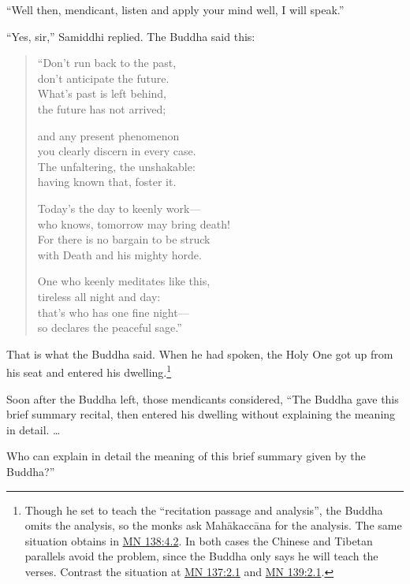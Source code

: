 \documentclass[12pt,openany]{book}%
\begin{document}
“Well then, mendicant, listen and apply your mind well, I will speak.” 

“Yes, sir,” Samiddhi replied. The Buddha said this: 

\begin{verse}%
“Don’t run back to the past, \\
don’t anticipate the future. \\
What’s past is left behind, \\
the future has not arrived; 

and any present phenomenon \\
you clearly discern in every case. \\
The unfaltering, the unshakable: \\
having known that, foster it. 

Today’s the day to keenly work—\\
who knows, tomorrow may bring death! \\
For there is no bargain to be struck \\
with Death and his mighty horde. 

One who keenly meditates like this, \\
tireless all night and day: \\
that’s who has one fine night—\\
so declares the peaceful sage.” 

%
\end{verse}

That is what the Buddha said. When he had spoken, the Holy One got up from his seat and entered his dwelling.\footnote{Though he set to teach the “recitation passage and analysis”, the Buddha omits the analysis, so the monks ask \textsanskrit{Mahākaccāna} for the analysis. The same situation obtains in \href{https://suttacentral.net/mn138/en/sujato\#4.2}{MN 138:4.2}. In both cases the Chinese and Tibetan parallels avoid the problem, since the Buddha only says he will teach the verses. Contrast the situation at \href{https://suttacentral.net/mn137/en/sujato\#2.1}{MN 137:2.1} and \href{https://suttacentral.net/mn139/en/sujato\#2.1}{MN 139:2.1}. } 

Soon after the Buddha left, those mendicants considered, “The Buddha gave this brief summary recital, then entered his dwelling without explaining the meaning in detail. … 

Who can explain in detail the meaning of this brief summary given by the Buddha?” 
\end{document}
